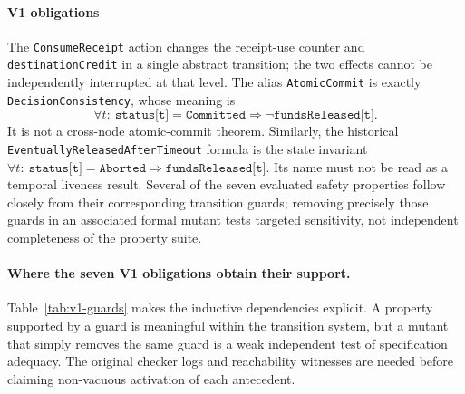 \paragraph{V1 obligations}
The \texttt{ConsumeReceipt} action changes the receipt-use counter and
\texttt{destinationCredit} in a single abstract transition; the two effects
cannot be independently interrupted at that level. The alias
\texttt{AtomicCommit} is exactly \texttt{DecisionConsistency}, whose
meaning is
\[
  \forall t:\ \texttt{status[t]}=\texttt{Committed}
  \Rightarrow \neg\texttt{fundsReleased[t]}.
\]
It is not a cross-node atomic-commit theorem. Similarly, the historical
\texttt{EventuallyReleasedAfterTimeout} formula is the state invariant
\(\forall t:\ \texttt{status[t]}=\texttt{Aborted}\Rightarrow
\texttt{fundsReleased[t]}\). Its name must not be read as a temporal
liveness result. Several of the seven evaluated safety properties follow
closely from their corresponding transition guards; removing precisely those
guards in an associated formal mutant tests targeted sensitivity, not
independent completeness of the property suite.

\paragraph{Where the seven V1 obligations obtain their support.}
Table~\ref{tab:v1-guards} makes the inductive dependencies explicit. A
property supported by a guard is meaningful within the transition system,
but a mutant that simply removes the same guard is a weak independent test
of specification adequacy. The original checker logs and reachability
witnesses are needed before claiming non-vacuous activation of each
antecedent.

